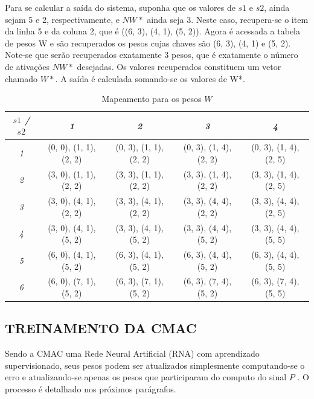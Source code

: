 Para se calcular a saída do sistema, suponha que os valores de $s1$ e $s2$, ainda sejam 5 e 2, respectivamente, e $NW*$ ainda seja 3. 
Neste caso, recupera-se o item da linha 5 e da coluna 2, que é ((6, 3), (4, 1), (5, 2)). 
Agora é acessada a tabela de pesos W e são recuperados os pesos cujas chaves são (6, 3), (4, 1) e (5, 2). 
Note-se que serão recuperados exatamente 3 pesos, que é exatamente o número de ativações $NW*$ desejadas. 
Os valores recuperados constituem um vetor chamado $W*$. A saída é calculada somando-se os valores de W*.



\begin{table}[ht]
	\centering
	\caption{Mapeamento para os pesos $W$}
	\label{wmap}
	\ABNTEXfontereduzida
	\begin{tabular}{c c c c c}
		\toprule
		\textit{$s1$ / $s2$} & \textit{1}  & \textit{2} & \textit{3} & \textit{4} \\
		\midrule
		\ABNTEXfontereduzida

		\textit{1} & (0, 0), (1, 1), (2, 2) & (0, 3), (1, 1), (2, 2) & (0, 3), (1, 4), (2, 2) & (0, 3), (1, 4), (2, 5) \\
		\textit{2} & (3, 0), (1, 1), (2, 2) & (3, 3), (1, 1), (2, 2) & (3, 3), (1, 4), (2, 2) & (3, 3), (1, 4), (2, 5) \\
		\textit{3} & (3, 0), (4, 1), (2, 2) & (3, 3), (4, 1), (2, 2) & (3, 3), (4, 4), (2, 2) & (3, 3), (4, 4), (2, 5) \\
		\textit{4} & (3, 0), (4, 1), (5, 2) & (3, 3), (4, 1), (5, 2) & (3, 3), (4, 4), (5, 2) & (3, 3), (4, 4), (5, 5) \\
		\textit{5} & (6, 0), (4, 1), (5, 2) & (6, 3), (4, 1), (5, 2) & (6, 3), (4, 4), (5, 2) & (6, 3), (4, 4), (5, 5) \\
		\textit{6} & (6, 0), (7, 1), (5, 2) & (6, 3), (7, 1), (5, 2) & (6, 3), (7, 4), (5, 2) & (6, 3), (7, 4), (5, 5) \\

		\bottomrule
	\end{tabular}
\end{table}
 


\subsection{TREINAMENTO DA CMAC}
Sendo a CMAC uma Rede Neural Artificial (RNA) com aprendizado supervisionado, seus pesos podem ser atualizados simplesmente computando-se o erro e atualizando-se apenas os pesos que participaram do computo do sinal $P$ \cite{Haykin1998}. O processo é detalhado nos próximos parágrafos.

